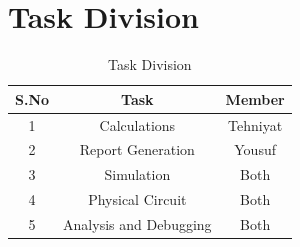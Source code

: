 \documentclass[12pt, a4paper]{article}
\begin{document}
    \section{Task Division}
    \begin{table}[h]
        \centering
        \begin{tabular}{|@{}c|c|c@{ }|}
            \hline
            \textbf{ S.No} & \textbf{Task}      & \textbf{Member } \\
            \hline
            1             & Calculations & Tehniyat             \\
            \hline
            2             & Report Generation  & Yousuf            \\
            \hline
            3             & Simulation      & Both             \\
            \hline
            4             & Physical Circuit      & Both              \\
            \hline
            5             & Analysis and Debugging      & Both              \\
            \hline
        \end{tabular}
        \caption{Task Division}
        \label{Table 1}
    \end{table}
\end{document}
